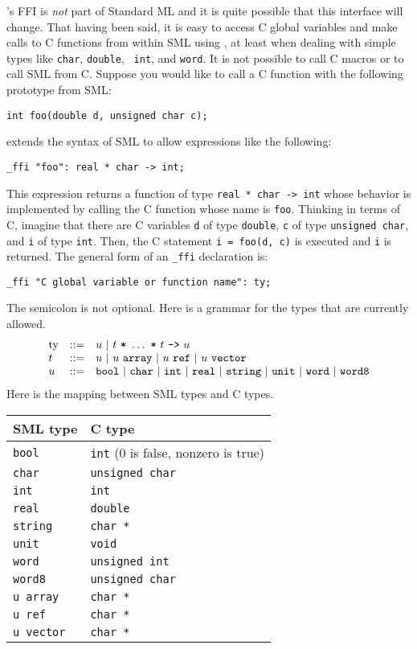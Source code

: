 
{\mlton}'s FFI is {\em not} part of Standard ML and it is quite possible that
this interface will change.  That having been said, it is easy to access C
global variables and make calls to C functions from within SML using {\mlton},
at least when dealing with simple types like {\tt char}, {\tt double}, {\tt
int}, and {\tt word}.  It is not possible to call C macros or to call SML from
C.  Suppose you would like to call a C function with the following prototype
from SML:
\begin{verbatim}
int foo(double d, unsigned char c);
\end{verbatim}
{\mlton} extends the syntax of SML to allow expressions like the following:
\begin{verbatim}
_ffi "foo": real * char -> int;
\end{verbatim}
This expression returns a function of type {\tt real * char -> int}
whose behavior is implemented by calling the C function whose name is
{\tt foo}.  Thinking in terms of C, imagine that there are C
variables {\tt d} of type {\tt double}, {\tt c} of type {\tt unsigned
char}, and {\tt i} of type {\tt int}.  Then, the C statement
\mbox{\tt i = foo(d, c)} is executed and {\tt i} is returned.
The general form of an \verb+_ffi+ declaration is:
\begin{verbatim}
_ffi "C global variable or function name": ty;
\end{verbatim}
The semicolon is not optional.  Here is a grammar for the types that
are currently allowed.
\[
\begin{array}{lcl}
\mbox{ty} & ::= & u \ |\  t\ \mbox{\tt *}\ \ldots\ \mbox{\tt *}\ t\ \mbox{\tt ->}\ u\\
t & ::= & u \ |\  u\ \mbox{\tt array} \ |\  u\ \mbox{\tt ref}
             \ |\  u\ \mbox{\tt vector}\\
u & ::= & \mbox{\tt bool} \ |\  \mbox{\tt char} \ |\  \mbox{\tt int} \ |\  \mbox{\tt real} \ |\  \mbox{\tt string} \ |\  \mbox{\tt unit} \ |\  \mbox{\tt word} \ |\  \mbox{\tt word8}\\
\end{array}
\]
Here is the mapping between SML types and C types.
\begin{center}
\begin{tabular}{ll}
SML type & C type\\
\hline
{\tt bool} & {\tt int} (0 is false, nonzero is true) \\
{\tt char} & {\tt unsigned char} \\
{\tt int} & {\tt int} \\
{\tt real} & {\tt double} \\
{\tt string} & {\tt char *} \\
{\tt unit} & {\tt void} \\
{\tt word} & {\tt unsigned int} \\
{\tt word8} & {\tt unsigned char} \\
{\tt u array} & {\tt char *} \\
{\tt u ref} & {\tt char *} \\
{\tt u vector} & {\tt char *} \\
\end{tabular}
\end{center}
